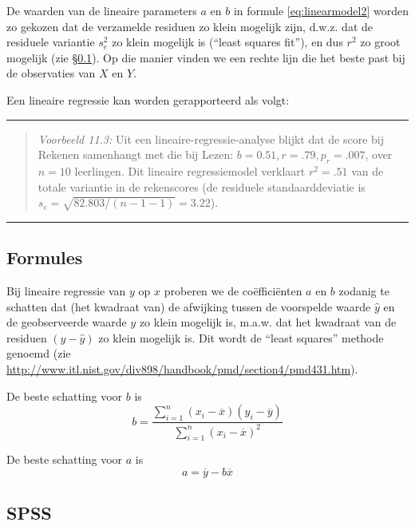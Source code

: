 \documentclass[
]{book}
\begin{document}
De waarden van de lineaire parameters \(a\) en \(b\) in
formule \eqref{eq:linearmodel2} worden zo gekozen dat de verzamelde
residuen zo klein mogelijk zijn, d.w.z. dat de residuele variantie
\(s^2_e\) zo klein mogelijk is (``least squares fit''), en dus \(r^2\) zo
groot mogelijk (zie
§\ref{sec:regressie-formules}). Op die manier vinden we een rechte
lijn die het beste past bij de observaties van \(X\) en \(Y\).

Een lineaire regressie kan worden gerapporteerd als volgt:

\begin{center}\rule{0.5\linewidth}{0.5pt}\end{center}

\begin{quote}
\emph{Voorbeeld 11.3:}
Uit een lineaire-regressie-analyse blijkt dat de score bij Rekenen
samenhangt met die bij Lezen: \(b=0.51, r=.79, p_r=.007\), over \(n=10\)
leerlingen. Dit lineaire regressiemodel verklaart \(r^2=.51\) van de
totale variantie in de rekenscores (de residuele standaarddeviatie is
\(s_e= \sqrt{82.803/(n-1-1)} = 3.22\)).
\end{quote}

\begin{center}\rule{0.5\linewidth}{0.5pt}\end{center}

\subsection{Formules}\label{sec:regressie-formules}

Bij lineaire regressie van \(y\) op \(x\) proberen we de coëfficiënten \(a\)
en \(b\) zodanig te schatten dat (het kwadraat van) de afwijking tussen de
voorspelde waarde \(\hat{y}\) en de geobserveerde waarde \(y\) zo klein
mogelijk is, m.a.w. dat het kwadraat van de residuen \((y-\hat{y})\) zo
klein mogelijk is. Dit wordt de ``least squares'' methode genoemd (zie
\url{http://www.itl.nist.gov/div898/handbook/pmd/section4/pmd431.htm}).

De beste schatting voor \(b\) is
\[b = \frac{ \sum_{i=1}^n (x_i-\overline{x})(y_i-\overline{y}) } { \sum_{i=1}^n (x_i-\overline{x})^2 }\]

De beste schatting voor \(a\) is \[a = \overline{y} - b \overline{x}\]

\subsection{SPSS}\label{spss-6}
\end{document}
